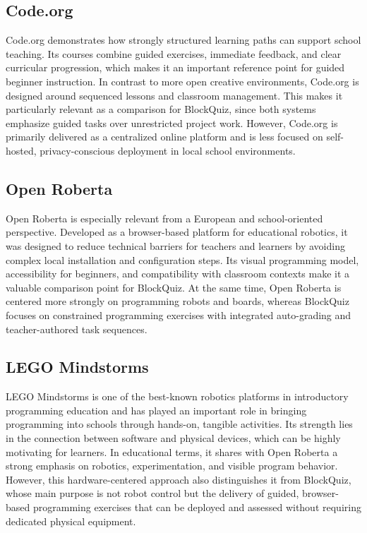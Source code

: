 \subsection*{Code.org}
Code.org \cite{codeorg2026} demonstrates how strongly structured learning paths can support school teaching. Its courses combine guided exercises,
immediate feedback, and clear curricular progression, which makes it an important reference point for guided beginner instruction.
In contrast to more open creative environments, Code.org is designed around sequenced lessons and classroom management. This makes it particularly relevant as a
comparison for BlockQuiz, since both systems emphasize guided tasks over unrestricted project work. However, Code.org is primarily delivered as a centralized
online platform and is less focused on self-hosted, privacy-conscious deployment in local school environments.

\subsection*{Open Roberta}
Open Roberta \cite{roperta} is especially relevant from a European and school-oriented perspective. Developed as a browser-based platform for educational robotics,
it was designed to reduce technical barriers for teachers and learners by avoiding complex local installation and configuration steps.
Its visual programming model, accessibility for beginners, and compatibility with classroom contexts make it a valuable comparison point for BlockQuiz.
At the same time, Open Roberta is centered more strongly on programming robots and boards, whereas BlockQuiz focuses on constrained programming exercises with
integrated auto-grading and teacher-authored task sequences.

\subsection*{LEGO Mindstorms}
LEGO Mindstorms \cite{lego} is one of the best-known robotics platforms in introductory programming education and has played an important role in bringing
programming into schools through hands-on, tangible activities. Its strength lies in the connection between software and physical devices,
which can be highly motivating for learners. In educational terms, it shares with Open Roberta a strong emphasis on robotics, experimentation,
and visible program behavior. However, this hardware-centered approach also distinguishes it from BlockQuiz, whose main purpose is not
robot control but the delivery of guided, browser-based programming exercises that can be deployed and assessed without requiring dedicated physical equipment.

